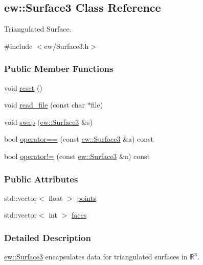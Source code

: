\hypertarget{classew_1_1Surface3}{
\subsection{ew::Surface3 Class Reference}
\label{classew_1_1Surface3}
}


Triangulated Surface.  




{\ttfamily \#include $<$ew/Surface3.h$>$}

\subsubsection*{Public Member Functions}
\begin{DoxyCompactItemize}
\item 
void \hyperlink{classew_1_1Surface3_ac4aeb8ec329e8f102dfdf884672f746b}{reset} ()
\item 
void \hyperlink{classew_1_1Surface3_ab3824a1268ef53827b73f30c9ff3ca47}{read\_\-file} (const char $\ast$file)
\item 
void \hyperlink{classew_1_1Surface3_a774d550017ec89d133e67e123bc00e52}{swap} (\hyperlink{classew_1_1Surface3}{ew::Surface3} \&s)
\item 
bool \hyperlink{classew_1_1Surface3_aa8396ef2bacc166a713fbce2d205f1b4}{operator==} (const \hyperlink{classew_1_1Surface3}{ew::Surface3} \&a) const 
\item 
bool \hyperlink{classew_1_1Surface3_ac4b7f1d423b851423afbabb08ced40f4}{operator!=} (const \hyperlink{classew_1_1Surface3}{ew::Surface3} \&a) const 
\end{DoxyCompactItemize}
\subsubsection*{Public Attributes}
\begin{DoxyCompactItemize}
\item 
std::vector$<$ float $>$ \hyperlink{classew_1_1Surface3_ae11685212f32705b1ef71ef60960a38f}{points}
\item 
std::vector$<$ int $>$ \hyperlink{classew_1_1Surface3_a97197763846e0f10ca529f0812de29d5}{faces}
\end{DoxyCompactItemize}


\subsubsection{Detailed Description}
\hyperlink{classew_1_1Surface3}{ew::Surface3} encapsulates data for triangulated surfaces in $\mathbb{R}^3$.

